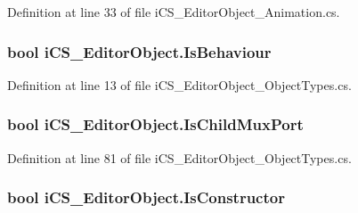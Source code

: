 Definition at line 33 of file i\+C\+S\+\_\+\+Editor\+Object\+\_\+\+Animation.\+cs.

\hypertarget{classi_c_s___editor_object_a1ad21f900e60892cf8b6ba5a10d6bcc8}{
\subsubsection[{Is\+Behaviour}]{\setlength{\rightskip}{0pt plus 5cm}bool i\+C\+S\+\_\+\+Editor\+Object.\+Is\+Behaviour\hspace{0.3cm}{\ttfamily [get]}}}\label{classi_c_s___editor_object_a1ad21f900e60892cf8b6ba5a10d6bcc8}


Definition at line 13 of file i\+C\+S\+\_\+\+Editor\+Object\+\_\+\+Object\+Types.\+cs.

\hypertarget{classi_c_s___editor_object_af46d9038298f6558b89a8a11ad0d6985}{
\subsubsection[{Is\+Child\+Mux\+Port}]{\setlength{\rightskip}{0pt plus 5cm}bool i\+C\+S\+\_\+\+Editor\+Object.\+Is\+Child\+Mux\+Port\hspace{0.3cm}{\ttfamily [get]}}}\label{classi_c_s___editor_object_af46d9038298f6558b89a8a11ad0d6985}


Definition at line 81 of file i\+C\+S\+\_\+\+Editor\+Object\+\_\+\+Object\+Types.\+cs.

\hypertarget{classi_c_s___editor_object_a0032cdbe1277eb3268ded5114411a072}{
\subsubsection[{Is\+Constructor}]{\setlength{\rightskip}{0pt plus 5cm}bool i\+C\+S\+\_\+\+Editor\+Object.\+Is\+Constructor\hspace{0.3cm}{\ttfamily [get]}}}\label{classi_c_s___editor_object_a0032cdbe1277eb3268ded5114411a072}


